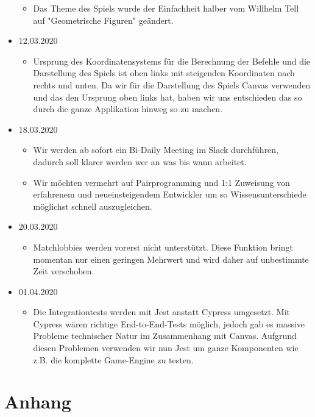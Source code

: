 \documentclass[11pt,a4paper,german]{scrartcl}
\let\oldsection\section
\renewcommand\section{\clearpage\oldsection}
\begin{document}
\begin{itemize}
\begin{itemize}
          \item Das Theme des Spiels wurde der Einfachheit halber vom Willhelm Tell auf "Geometrische Figuren" geändert.
        \end{itemize}
  \item 12.03.2020
        \begin{itemize}
          \item Ursprung des Koordinatensystems für die Berechnung der Befehle und die Darstellung des Spiels ist oben links
                mit steigenden Koordinaten nach rechts und unten. Da wir für die Darstellung des Spiels Canvas verwenden und das den
                Ursprung oben links hat, haben wir uns entschieden das so durch die ganze Applikation hinweg so zu machen.
        \end{itemize}
  \item 18.03.2020
        \begin{itemize}
          \item Wir werden ab sofort ein Bi-Daily Meeting im Slack durchführen, dadurch soll klarer werden wer an was bis wann arbeitet.
          \item Wir möchten vermehrt auf Pairprogramming und 1:1 Zuweisung von erfahrenem und neueinsteigendem Entwickler um so
                Wissensunterschiede möglichst schnell auszugleichen.
        \end{itemize}
  \item 20.03.2020
        \begin{itemize}
          \item Matchlobbies werden vorerst nicht unterstützt. Diese Funktion bringt momentan nur einen geringen Mehrwert und wird daher auf unbestimmte
                Zeit verschoben.
        \end{itemize}
  \item 01.04.2020
        \begin{itemize}
          \item Die Integrationtests werden mit Jest anstatt Cypress umgesetzt. Mit Cypress wären richtige End-to-End-Tests möglich, jedoch gab es massive Probleme technischer Natur im Zusammenhang mit Canvas. 
                Aufgrund diesen Problemen verwenden wir nun Jest um ganze Komponenten wie z.B. die komplette Game-Engine zu testen.
        \end{itemize}
\end{itemize}

\section{Anhang}
\end{document}
